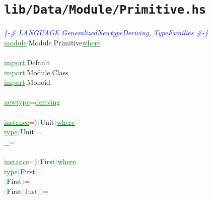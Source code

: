 \section{\texttt{lib/Data/Module/Primitive.hs}}
\label{mod:Data.Module.Primitive}
\textcolor{blue}{{\it{}\{-\# LANGUAGE GeneralizedNewtypeDeriving, TypeFamilies \#-\}}}\\\textcolor{green}{\underline{module}}\textcolor{cyan}{.}{\rm{}Module}\textcolor{cyan}{.}{\rm{}Primitive}\hsspace \textcolor{green}{\underline{where}}\\\\\textcolor{green}{\underline{import}}\textcolor{cyan}{.}{\rm{}Default}\\\textcolor{green}{\underline{import}}\textcolor{cyan}{.}{\rm{}Module}\textcolor{cyan}{.}{\rm{}Class}\\\textcolor{green}{\underline{import}}\textcolor{cyan}{.}{\rm{}Monoid}\\\\\textcolor{green}{\underline{newtype}}\hsspace \textcolor{red}{=}\hsspace {\rm{}()}\hsspace \textcolor{green}{\underline{deriving}}\\\\\textcolor{green}{\underline{instance}}\hsspace \textcolor{red}{=\ensuremath{\rangle}}\hsspace \textcolor{cyan}{(}{\rm{}Unit}\textcolor{cyan}{)}\hsspace \textcolor{green}{\underline{where}}\\\hstab \textcolor{green}{\underline{type}}\hsspace \textcolor{cyan}{(}{\rm{}Unit}\textcolor{cyan}{)}\hsspace \textcolor{red}{=}\\\hsspace \textcolor{green}{\underline{\_}}\hsspace \textcolor{red}{=}\\\\\textcolor{green}{\underline{instance}}\hsspace \textcolor{red}{=\ensuremath{\rangle}}\hsspace \textcolor{cyan}{(}{\rm{}First}\textcolor{cyan}{)}\hsspace \textcolor{green}{\underline{where}}\\\hstab \textcolor{green}{\underline{type}}\hsspace \textcolor{cyan}{(}{\rm{}First}\textcolor{cyan}{)}\hsspace \textcolor{red}{=}\\\hsspace \textcolor{cyan}{(}{\rm{}First}\hsspace \hsspace \textcolor{cyan}{)}\hsspace \textcolor{red}{=}\\\hsspace \textcolor{cyan}{(}{\rm{}First}\hsspace \textcolor{cyan}{(}{\rm{}Just}\textcolor{cyan}{)}\textcolor{cyan}{)}\hsspace \textcolor{red}{=}\\
